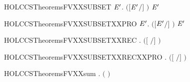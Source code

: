\newcommand{\HOLCCSTheoremsFVXXrestr}{\UseVerbatim{HOLCCSTheoremsFVXXrestr}}
\begin{SaveVerbatim}{HOLCCSTheoremsFVXXSUBSET}
\HOLTokenTurnstile{} \HOLSymConst{\HOLTokenForall{}}  \ensuremath{\HOLBoundVar{E}\sp{\prime}}.  \ensuremath{(}\ensuremath{[}\ensuremath{\HOLBoundVar{E}\sp{\prime}}\ensuremath{/}\ensuremath{]} \ensuremath{)} \HOLConst{\HOLTokenSubset{}}   \HOLConst{\HOLTokenUnion{}}  \ensuremath{\HOLBoundVar{E}\sp{\prime}}
\end{SaveVerbatim}
\newcommand{\HOLCCSTheoremsFVXXSUBSET}{\UseVerbatim{HOLCCSTheoremsFVXXSUBSET}}
\begin{SaveVerbatim}{HOLCCSTheoremsFVXXSUBSETXXPRO}
\HOLTokenTurnstile{} \HOLSymConst{\HOLTokenForall{}}  \ensuremath{\HOLBoundVar{E}\sp{\prime}}.  \ensuremath{(}\ensuremath{[}\ensuremath{\HOLBoundVar{E}\sp{\prime}}\ensuremath{/}\ensuremath{]} \ensuremath{)} \HOLConst{\HOLTokenSubset{}}     \HOLConst{\HOLTokenUnion{}}  \ensuremath{\HOLBoundVar{E}\sp{\prime}}
\end{SaveVerbatim}
\newcommand{\HOLCCSTheoremsFVXXSUBSETXXPRO}{\UseVerbatim{HOLCCSTheoremsFVXXSUBSETXXPRO}}
\begin{SaveVerbatim}{HOLCCSTheoremsFVXXSUBSETXXREC}
\HOLTokenTurnstile{} \HOLSymConst{\HOLTokenForall{}} .  \ensuremath{(}\ensuremath{[}  \ensuremath{/}\ensuremath{]} \ensuremath{)} \HOLConst{\HOLTokenSubset{}}  
\end{SaveVerbatim}
\newcommand{\HOLCCSTheoremsFVXXSUBSETXXREC}{\UseVerbatim{HOLCCSTheoremsFVXXSUBSETXXREC}}
\begin{SaveVerbatim}{HOLCCSTheoremsFVXXSUBSETXXRECXXPRO}
\HOLTokenTurnstile{} \HOLSymConst{\HOLTokenForall{}} .  \ensuremath{(}\ensuremath{[}  \ensuremath{/}\ensuremath{]} \ensuremath{)} \HOLConst{\HOLTokenSubset{}}    
\end{SaveVerbatim}
\newcommand{\HOLCCSTheoremsFVXXSUBSETXXRECXXPRO}{\UseVerbatim{HOLCCSTheoremsFVXXSUBSETXXRECXXPRO}}
\begin{SaveVerbatim}{HOLCCSTheoremsFVXXsum}
\HOLTokenTurnstile{} \HOLSymConst{\HOLTokenForall{}} .  \ensuremath{(} \HOLSymConst{\ensuremath{+}} \ensuremath{)} \HOLSymConst{\ensuremath{=}}   \HOLConst{\HOLTokenUnion{}}  
\end{SaveVerbatim}
